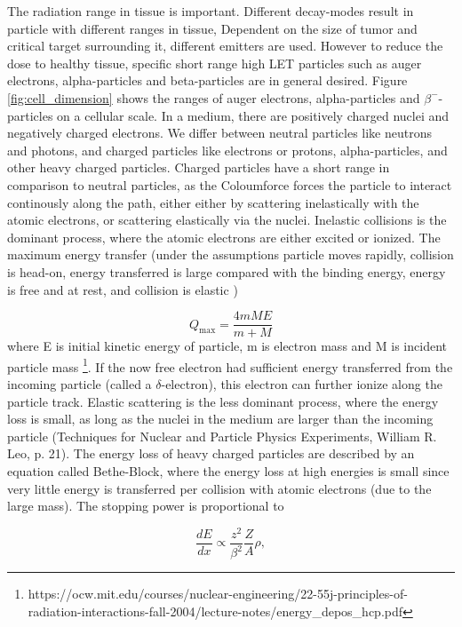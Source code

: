 The radiation range in tissue is important. Different decay-modes result in particle with different ranges in tissue, Dependent on the size of tumor and critical target surrounding it, different emitters are used. However to reduce the dose to healthy tissue, specific short range high LET particles such as auger electrons, alpha-particles and beta-particles are in general desired. Figure \ref{fig:cell_dimension} shows the ranges of auger electrons, alpha-particles and $\beta^-$-particles on a cellular scale. In a medium, there are positively charged nuclei and negatively charged electrons. We differ between neutral particles like neutrons and photons, and charged particles like electrons or protons, alpha-particles, and other heavy charged particles. Charged particles have a short range in comparison to neutral particles, as the Coloumforce forces the particle to interact continously along the path, either either by scattering inelastically with the atomic electrons, or scattering elastically via the nuclei. Inelastic collisions is the dominant process, where the atomic electrons are either excited or ionized. The maximum energy transfer (under the assumptions particle moves rapidly, collision is head-on, energy transferred is large compared with the binding energy, energy is free and at rest, and collision is elastic )

\begin{equation}
    Q_\text{max}=\frac{4mME}{m+M}
\end{equation}
where E is initial kinetic energy of particle, m is electron mass and M is incident particle mass \footnote{https://ocw.mit.edu/courses/nuclear-engineering/22-55j-principles-of-radiation-interactions-fall-2004/lecture-notes/energy_depos_hcp.pdf}. If the now free electron had sufficient energy transferred from the incoming particle (called a $\delta$-electron), this electron can further ionize along the particle track. Elastic scattering is the less dominant process, where the energy loss is small, as long as the nuclei in the medium are larger than the incoming particle (Techniques for Nuclear and Particle Physics Experiments, William R. Leo, p. 21). The energy loss of heavy charged particles are described by an equation called Bethe-Block, where the energy loss at high energies is small since very little energy is transferred per collision with atomic electrons (due to the large mass).  The stopping power is proportional to

\begin{equation}
    \frac{dE}{dx}\propto \frac{z^2}{\beta^2}\frac{Z}{A} \rho,
\end{equation}

